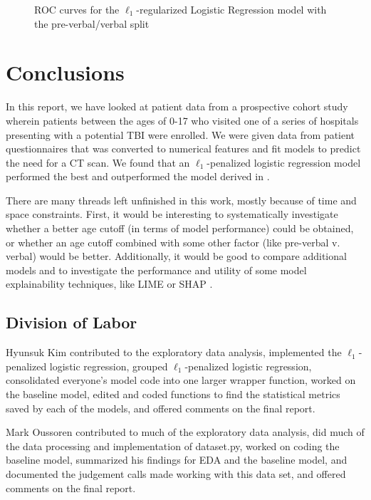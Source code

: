 \documentclass[11pt, letterpaper]{amsart}
\let\Oldsection\section
\renewcommand{\section}{\FloatBarrier\Oldsection}
\let\Oldsubsection\subsection
\renewcommand{\subsection}{\FloatBarrier\Oldsubsection}
\begin{document}
\begin{figure}
\begin{minipage}[b]{0.5\linewidth}
		\label{fig:lr_test_roc_vb}
	\end{minipage}
	\caption{ROC curves for the $\ell_1$-regularized Logistic Regression model with the pre-verbal/verbal split}\label{fig:lr_roc_vb}
\end{figure}

\section{Conclusions} \label{sec:conclusions}

In this report, we have looked at patient data from a prospective cohort study wherein patients between the ages of 0-17 who visited one of a series of hospitals presenting with a potential TBI were enrolled. We were given data from patient questionnaires that was converted to numerical features and fit models to predict the need for a CT scan. We found that an $\ell_1$-penalized logistic regression model performed the best and outperformed the model derived in  \cite{kuppermann2009identification}. 

There are many threads left unfinished in this work, mostly because of time and space constraints. First, it would be interesting to systematically investigate whether a better age cutoff (in terms of model performance) could be obtained, or whether an age cutoff combined with some other factor (like pre-verbal v. verbal) would be better. Additionally, it would be good to compare additional models and to investigate the performance and utility of some model explainability techniques, like LIME \cite{ribeiro2016should} or SHAP \cite{vstrumbelj2014explaining}. 


\subsection{Division of Labor}

Hyunsuk Kim contributed to the exploratory data analysis, implemented the $\ell_1$-penalized logistic regression, grouped $\ell_1$-penalized logistic regression, consolidated everyone's model code into one larger wrapper function, worked on the baseline model, edited and coded functions to find the statistical metrics saved by each of the models, and offered comments on the final report.

Mark Oussoren contributed to much of the exploratory data analysis, did much of the data processing and implementation of dataset.py, worked on coding the baseline model, summarized his findings for EDA and the baseline model, and documented the judgement calls made working with this data set, and offered comments on the final report.
\end{document}
